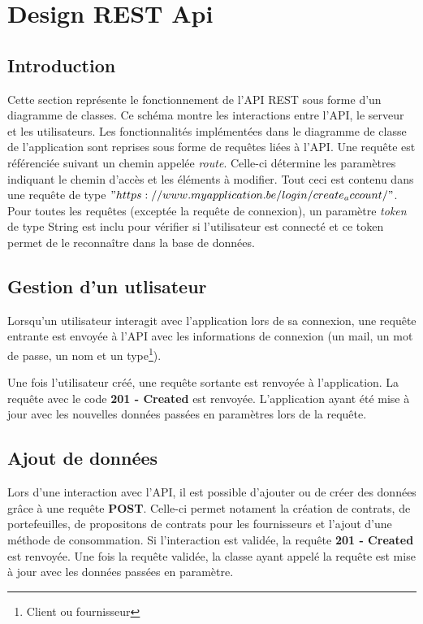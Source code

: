 \section{Design REST Api}
\subsection{Introduction}
\begin{flushleft}
Cette section représente le fonctionnement de l'API REST sous forme d'un diagramme de classes. Ce schéma montre les interactions entre l'API, le serveur et les utilisateurs. Les fonctionnalités implémentées dans le diagramme de classe de l'application sont reprises sous forme de requêtes liées à l'API.  Une requête est référenciée suivant un chemin appelée \emph{route}. Celle-ci détermine les paramètres indiquant le chemin d'accès et les éléments à modifier. Tout ceci est contenu dans une requête de type $"https://www.myapplication.be/login/create_account/"$. Pour toutes les requêtes (exceptée la requête de connexion), un paramètre \emph{token} de type String est inclu pour vérifier si l'utilisateur est connecté et ce token permet de le reconnaître dans la base de données.
\end{flushleft}

\subsection{Gestion d'un utlisateur}
\begin{flushleft}
Lorsqu'un utilisateur interagit avec l'application lors de sa connexion, une requête entrante est envoyée à l'API avec les informations de connexion (un mail, un mot de passe, un nom et un type\footnote{Client ou fournisseur}).
\end{flushleft}

\begin{flushleft}
Une fois l'utilisateur créé, une requête sortante est renvoyée à l'application. La requête avec le code \textbf{201 - Created} est renvoyée. L'application ayant été mise à jour avec les nouvelles données passées en paramètres lors de la requête.
\end{flushleft}

\subsection{Ajout de données}
\begin{flushleft}
Lors d'une interaction avec l'API, il est possible d'ajouter ou de créer des données grâce à une requête \textbf{POST}. Celle-ci permet notament la création de contrats, de portefeuilles, de propositons de contrats pour les fournisseurs et l'ajout d'une méthode de consommation. Si l'interaction est validée, la requête \textbf{201 - Created} est renvoyée. Une fois la requête validée, la classe ayant appelé la requête est mise à jour avec les données passées en paramètre.
\end{flushleft}
\newpage
